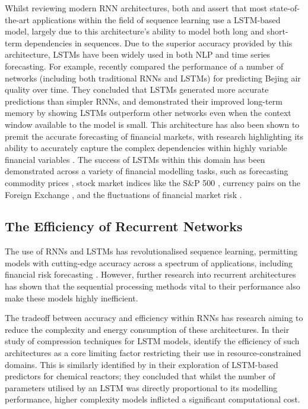 \documentclass[a4paper, 11pt]{report}
\begin{document}
    Whilst reviewing modern RNN architectures, both \citet{lipton-2015} and \citet{yu-2019} assert that most state-of-the-art applications within the field of sequence learning use a LSTM-based model, largely due to this architecture's ability to model both long and short-term dependencies in sequences. Due to the superior accuracy provided by this architecture, LSTMs have been widely used in both NLP and time series forecasting. For example, \citet{shi-2022} recently compared the performance of a number of networks (including both traditional RNNs and LSTMs) for predicting Bejing air quality over time. They concluded that LSTMs generated more accurate predictions than simpler RNNs, and demonstrated their improved long-term memory by showing LSTMs outperform other networks even when the context window available to the model is small. This architecture has also been shown to premit the accurate forecasting of financial markets, with research highlighting its ability to accurately capture the complex dependencies within highly variable financial variables \citep{li-2017}. The success of LSTMs within this domain has been demonstrated across a variety of financial modelling tasks, such as forecasting commodity prices \citep{ly-2021}, stock market indices like the S\&P 500 \citep{fjellstrom-2022}, currency pairs on the Foreign Exchange \citep{qi-2021}, and the fluctuations of financial market risk \citep{du-2019}.


    \subsection{The Efficiency of Recurrent Networks}

    The use of RNNs and LSTMs has revolutionalised sequence learning, permitting models with cutting-edge accuracy across a spectrum of applications, including financial risk forecasting \citep{du-2019}. However, further research into recurrent architectures has shown that the sequential processing methods vital to their performance also make these models highly inefficient.

    The tradeoff between accuracy and efficiency within RNNs has research aiming to reduce the complexity and energy consumption of these architectures. In their study of compression techniques for LSTM models, \citet{wang-2018} identify the efficiency of such architectures as a core limiting factor restricting their use in resource-constrained domains. This is similarly identified by \citet{zarzycki-2021} in their exploration of LSTM-based predictors for chemical reactors; they concluded that whilst the number of parameters utilised by an LSTM was directly proportional to its modelling performance, higher complexity models inflicted a significant computational cost. 
\end{document}

